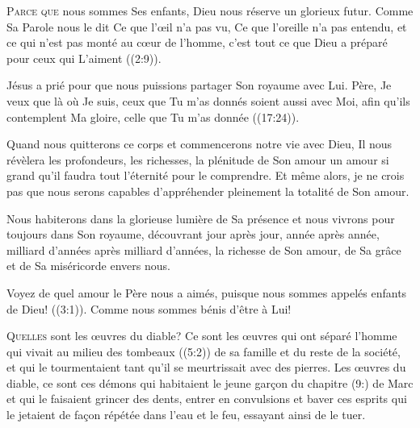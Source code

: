 \lettrine{P}{arce que} nous sommes Ses enfants,
 Dieu nous réserve un glorieux futur.
 Comme Sa Parole nous le dit\frcolon{} 
 \Og Ce que l'\oe{}il n'a pas vu, Ce que l'oreille n'a pas entendu,
 et ce qui n'est pas monté au c\oe{}ur de l'homme,
 c'est tout ce que Dieu a préparé pour ceux qui L'aiment \Fg{}
 ((2:9)). 

Jésus a prié pour que nous puissions partager Son royaume avec Lui.
 \Og Père, Je veux que là où Je suis, ceux que Tu m'as donnés
 soient aussi avec Moi, afin qu'ils contemplent Ma gloire,
 celle que Tu m'as donnée \Fg{} ((17:24)). 


Quand nous quitterons ce corps et commencerons notre vie avec Dieu,
 Il nous révèlera les profondeurs, les richesses, la plénitude de Son amour
 \ocadr un amour si grand qu'il faudra tout l'éternité pour le comprendre.
 Et même alors, je ne crois pas que nous serons capables d'appréhender
 pleinement la totalité de Son amour. 

Nous habiterons dans la glorieuse lumière de Sa présence et nous vivrons
 pour toujours dans Son royaume, découvrant jour après jour,
 année après année, milliard d'années après milliard d'années,
 la richesse de Son amour, de Sa grâce et de Sa miséricorde envers nous. 

\Og Voyez de quel amour le Père nous a aimés, puisque nous sommes appelés
 enfants de Dieu! \Fg{} ((3:1)).
 Comme nous sommes bénis d'être à Lui! 

\dvrule







\lettrine{Q}{uelles} sont les \oe{}uvres du diable?
 Ce sont les \oe{}uvres qui ont séparé l'homme qui vivait
 au milieu des tombeaux ((5:2)) de sa famille
 et du reste de la société, et qui le tourmentaient tant
 qu'il se meurtrissait avec des pierres.
 Les \oe{}uvres du diable, ce sont ces démons qui habitaient le jeune gar\c{c}on
 du chapitre (9:) de Marc et qui le faisaient grincer des dents,
 entrer en convulsions et baver \ocadr ces esprits qui le jetaient
 de fa\c{c}on répétée dans l'eau et le feu, essayant ainsi de le tuer. 


